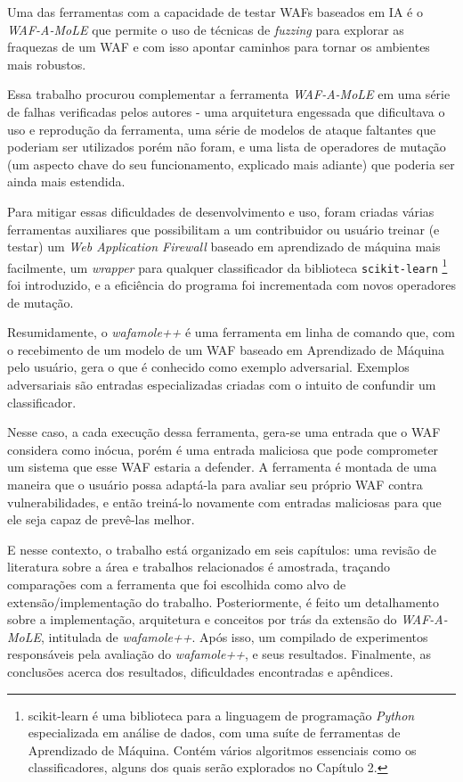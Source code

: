 Uma das ferramentas com a capacidade de testar WAFs baseados em IA é o \textit{WAF-A-MoLE} \cite{valenza_waf--mole_2020} que permite o uso de técnicas de \textit{fuzzing} \cite{fuzzing_book} para explorar as fraquezas de um WAF e com isso apontar caminhos para tornar os ambientes mais robustos.

Essa trabalho procurou complementar a ferramenta \textit{WAF-A-MoLE} em uma série de falhas verificadas pelos autores - uma arquitetura engessada que dificultava o uso e reprodução da ferramenta, uma série de modelos de ataque faltantes que poderiam ser utilizados porém não foram, e uma lista de operadores de mutação (um aspecto chave do seu funcionamento, explicado mais adiante) que poderia ser ainda mais estendida. 

Para mitigar essas dificuldades de desenvolvimento e uso, foram criadas várias ferramentas auxiliares que possibilitam a um contribuidor ou usuário treinar (e testar) um \textit{Web Application Firewall} baseado em aprendizado de máquina mais facilmente, um \textit{wrapper} para qualquer classificador da biblioteca \verb+scikit-learn+ \footnote{scikit-learn é uma biblioteca para a linguagem de programação \textit{Python} especializada em análise de dados, com uma suíte de ferramentas de Aprendizado de Máquina. Contém vários algoritmos essenciais como os classificadores, alguns dos quais serão explorados no Capítulo 2.} foi introduzido, e a eficiência do programa foi incrementada com novos operadores de mutação.

Resumidamente, o \textit{wafamole++} é uma ferramenta em linha de comando que, com o recebimento de um modelo de um WAF baseado em Aprendizado de Máquina pelo usuário, gera o que é conhecido como exemplo adversarial. Exemplos adversariais são entradas especializadas criadas com o intuito de confundir um classificador. 

Nesse caso, a cada execução dessa ferramenta, gera-se uma entrada que o WAF considera como inócua, porém é uma entrada maliciosa que pode comprometer um sistema que esse WAF estaria a defender. A ferramenta é montada de uma maneira que o usuário possa adaptá-la para avaliar seu próprio WAF contra vulnerabilidades, e então treiná-lo novamente com entradas maliciosas para que ele seja capaz de prevê-las melhor.

E nesse contexto, o trabalho está organizado em seis capítulos: uma revisão de literatura sobre a área e trabalhos relacionados é amostrada, traçando comparações com a ferramenta que foi escolhida como alvo de extensão/implementação do trabalho. Posteriormente, é feito um detalhamento sobre a implementação, arquitetura e conceitos por trás da extensão do \textit{WAF-A-MoLE}, intitulada de \textit{wafamole++}. Após isso, um compilado de experimentos responsáveis pela avaliação do \textit{wafamole++}, e seus resultados. Finalmente, as conclusões acerca dos resultados, dificuldades encontradas e apêndices.

\bigskip
